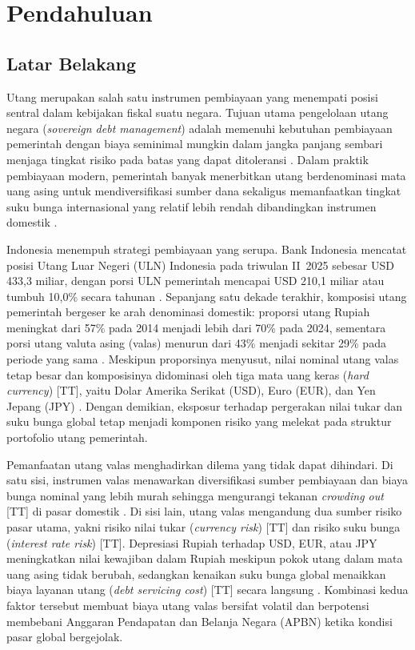 \chapter{Pendahuluan}\label{ch:introduction}


\section{Latar Belakang}
\label{sec:latar-belakang}
Utang merupakan salah satu instrumen pembiayaan yang menempati posisi sentral dalam kebijakan fiskal suatu negara. Tujuan utama pengelolaan utang negara (\textit{sovereign debt management}) adalah memenuhi kebutuhan pembiayaan pemerintah dengan biaya seminimal mungkin dalam jangka panjang sembari menjaga tingkat risiko pada batas yang dapat ditoleransi . Dalam praktik pembiayaan modern, pemerintah banyak menerbitkan utang berdenominasi mata uang asing untuk mendiversifikasi sumber dana sekaligus memanfaatkan tingkat suku bunga internasional yang relatif lebih rendah dibandingkan instrumen domestik .

Indonesia menempuh strategi pembiayaan yang serupa. Bank Indonesia mencatat posisi Utang Luar Negeri (ULN) Indonesia pada triwulan II~2025 sebesar USD 433,3 miliar, dengan porsi ULN pemerintah mencapai USD 210,1 miliar atau tumbuh 10,0\% secara tahunan . Sepanjang satu dekade terakhir, komposisi utang pemerintah bergeser ke arah denominasi domestik: proporsi utang Rupiah meningkat dari 57\% pada 2014 menjadi lebih dari 70\% pada 2024, sementara porsi utang valuta asing (valas) menurun dari 43\% menjadi sekitar 29\% pada periode yang sama . Meskipun proporsinya menyusut, nilai nominal utang valas tetap besar dan komposisinya didominasi oleh tiga mata uang keras (\textit{hard currency}) [TT], yaitu Dolar Amerika Serikat (USD), Euro (EUR), dan Yen Jepang (JPY) . Dengan demikian, eksposur terhadap pergerakan nilai tukar dan suku bunga global tetap menjadi komponen risiko yang melekat pada struktur portofolio utang pemerintah.

Pemanfaatan utang valas menghadirkan dilema yang tidak dapat dihindari. Di satu sisi, instrumen valas menawarkan diversifikasi sumber pembiayaan dan biaya bunga nominal yang lebih murah sehingga mengurangi tekanan \textit{crowding out} [TT] di pasar domestik . Di sisi lain, utang valas mengandung dua sumber risiko pasar utama, yakni risiko nilai tukar (\textit{currency risk}) [TT] dan risiko suku bunga (\textit{interest rate risk}) [TT]. Depresiasi Rupiah terhadap USD, EUR, atau JPY meningkatkan nilai kewajiban dalam Rupiah meskipun pokok utang dalam mata uang asing tidak berubah, sedangkan kenaikan suku bunga global menaikkan biaya layanan utang (\textit{debt servicing cost}) [TT] secara langsung . Kombinasi kedua faktor tersebut membuat biaya utang valas bersifat volatil dan berpotensi membebani Anggaran Pendapatan dan Belanja Negara (APBN) ketika kondisi pasar global bergejolak.


